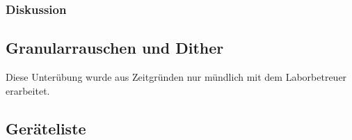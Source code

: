 \clearpage

\subsubsection{Diskussion}

%
%

\subsection{Granularrauschen und Dither}
Diese Unterübung wurde aus Zeitgründen nur mündlich mit dem Laborbetreuer erarbeitet. 

\subsection{Geräteliste}